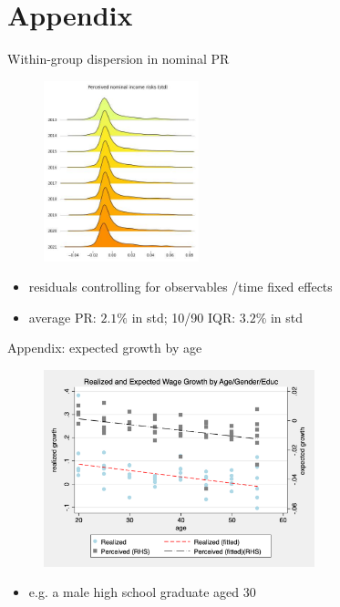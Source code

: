\documentclass{beamer}
\begin{document}


\section*{Appendix}



\begin{frame}{Within-group dispersion in nominal PR}
	\label{appendix:incstd}
	\begin{figure}
		\centering
		\includegraphics[width=0.4\textwidth]{figures/joy_incstd.jpg}
	\end{figure}
	\begin{itemize}
		\item  residuals controlling for observables /time fixed effects
		\item average PR:  $2.1\%$ in std; 10/90 IQR: $3.2\%$ in std \quad \hyperlink{rincstd_hist}{}    
	\end{itemize}
\end{frame}

\begin{frame}{Appendix: expected growth by age}
	\begin{figure}[ht]
		\label{appendix:age_gender_educ_level_compare_figure}
		\centering
		\includegraphics[width=0.7\textwidth]{figures/real_log_wage_gr_level_by_age_edu_gender_compare.png}
	\end{figure}
	\begin{itemize}
		\item e.g. a male high school graduate aged 30 
	\end{itemize}
\end{frame}
\end{document}
